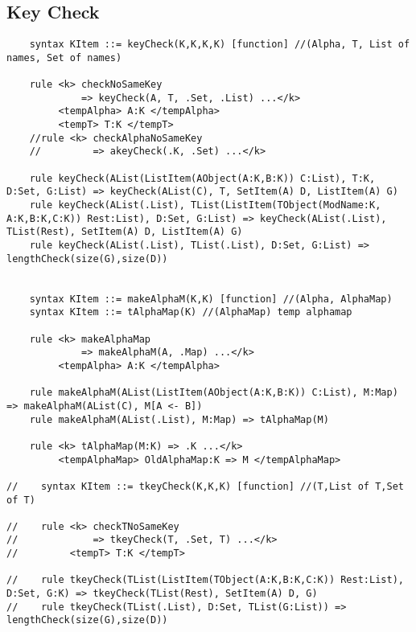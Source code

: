 \subsection{Key Check}
\begin{lstlisting}
    syntax KItem ::= keyCheck(K,K,K,K) [function] //(Alpha, T, List of names, Set of names)

    rule <k> checkNoSameKey
             => keyCheck(A, T, .Set, .List) ...</k>
         <tempAlpha> A:K </tempAlpha>
         <tempT> T:K </tempT>
    //rule <k> checkAlphaNoSameKey
    //         => akeyCheck(.K, .Set) ...</k>

    rule keyCheck(AList(ListItem(AObject(A:K,B:K)) C:List), T:K, D:Set, G:List) => keyCheck(AList(C), T, SetItem(A) D, ListItem(A) G)
    rule keyCheck(AList(.List), TList(ListItem(TObject(ModName:K, A:K,B:K,C:K)) Rest:List), D:Set, G:List) => keyCheck(AList(.List), TList(Rest), SetItem(A) D, ListItem(A) G)
    rule keyCheck(AList(.List), TList(.List), D:Set, G:List) => lengthCheck(size(G),size(D))


    syntax KItem ::= makeAlphaM(K,K) [function] //(Alpha, AlphaMap)
    syntax KItem ::= tAlphaMap(K) //(AlphaMap) temp alphamap

    rule <k> makeAlphaMap
             => makeAlphaM(A, .Map) ...</k>
         <tempAlpha> A:K </tempAlpha>

    rule makeAlphaM(AList(ListItem(AObject(A:K,B:K)) C:List), M:Map) => makeAlphaM(AList(C), M[A <- B])
    rule makeAlphaM(AList(.List), M:Map) => tAlphaMap(M)

    rule <k> tAlphaMap(M:K) => .K ...</k>
         <tempAlphaMap> OldAlphaMap:K => M </tempAlphaMap>

//    syntax KItem ::= tkeyCheck(K,K,K) [function] //(T,List of T,Set of T)

//    rule <k> checkTNoSameKey
//             => tkeyCheck(T, .Set, T) ...</k>
//         <tempT> T:K </tempT>

//    rule tkeyCheck(TList(ListItem(TObject(A:K,B:K,C:K)) Rest:List), D:Set, G:K) => tkeyCheck(TList(Rest), SetItem(A) D, G)
//    rule tkeyCheck(TList(.List), D:Set, TList(G:List)) => lengthCheck(size(G),size(D))

\end{lstlisting}

